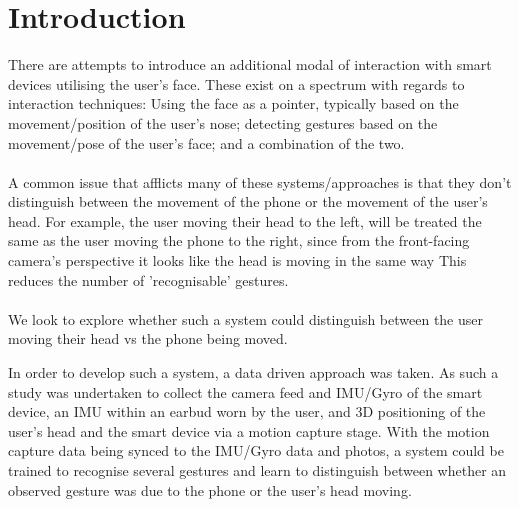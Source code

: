 \section{Introduction} %

There are attempts to introduce an additional modal of interaction with smart devices utilising the user's face.
These exist on a spectrum with regards to interaction techniques: Using the face as a pointer, typically based on the movement/position of the user's nose; detecting gestures based on the movement/pose of the user's face; and a combination of the two.
\\\\
A common issue that afflicts many of these systems/approaches is that they don't distinguish between the movement of the phone or the movement of the user's head. For example, the user moving their head to the left, will be treated the same as the user moving the phone to the right, since from the front-facing camera's perspective it looks like the head is moving in the same way%
This reduces the number of 'recognisable' gestures.
\\\\
We look to explore whether such a system could distinguish between the user moving their head vs the phone being moved. %

In order to develop such a system, a data driven approach was taken.
As such a study was undertaken to collect the camera feed and IMU/Gyro of the smart device, an IMU within an earbud worn by the user, and 3D positioning of the user's head and the smart device via a motion capture stage.
With the motion capture data being synced to the IMU/Gyro data and photos, a system could be trained to recognise several gestures and learn to distinguish between whether an observed gesture was due to the phone or the user's head moving.






